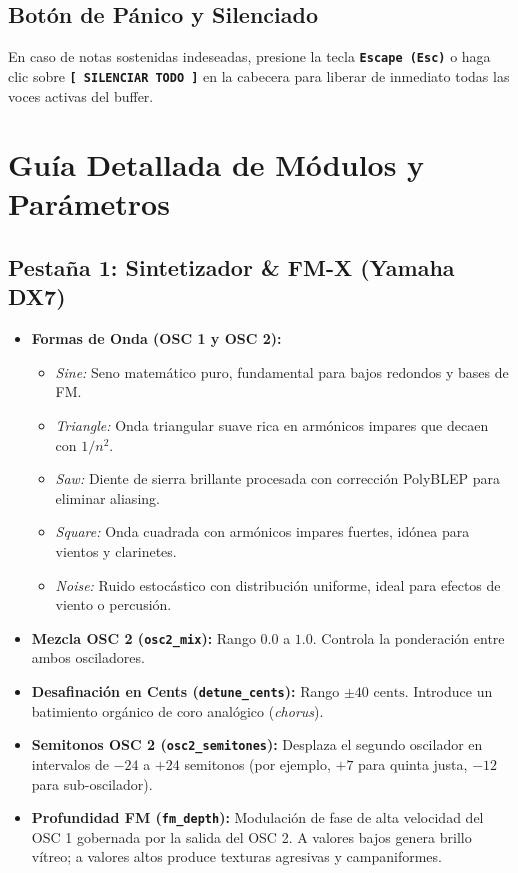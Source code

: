 \documentclass[11pt,a4paper]{article}
\begin{document}
\subsection{Botón de Pánico y Silenciado}
En caso de notas sostenidas indeseadas, presione la tecla \textbf{\texttt{Escape (Esc)}} o haga clic sobre \textbf{\texttt{[ SILENCIAR TODO ]}} en la cabecera para liberar de inmediato todas las voces activas del buffer.

\section{Guía Detallada de Módulos y Parámetros}

\subsection{Pestaña 1: Sintetizador \& FM-X (Yamaha DX7)}
\begin{itemize}[leftmargin=1.5cm]
    \item \textbf{Formas de Onda (OSC 1 y OSC 2):}
    \begin{itemize}
        \item \textit{Sine:} Seno matemático puro, fundamental para bajos redondos y bases de FM.
        \item \textit{Triangle:} Onda triangular suave rica en armónicos impares que decaen con $1/n^2$.
        \item \textit{Saw:} Diente de sierra brillante procesada con corrección PolyBLEP para eliminar aliasing.
        \item \textit{Square:} Onda cuadrada con armónicos impares fuertes, idónea para vientos y clarinetes.
        \item \textit{Noise:} Ruido estocástico con distribución uniforme, ideal para efectos de viento o percusión.
    \end{itemize}
    \item \textbf{Mezcla OSC 2 (\texttt{osc2\_mix}):} Rango $0.0$ a $1.0$. Controla la ponderación entre ambos osciladores.
    \item \textbf{Desafinación en Cents (\texttt{detune\_cents}):} Rango $\pm 40\text{ cents}$. Introduce un batimiento orgánico de coro analógico (\textit{chorus}).
    \item \textbf{Semitonos OSC 2 (\texttt{osc2\_semitones}):} Desplaza el segundo oscilador en intervalos de $-24$ a $+24$ semitonos (por ejemplo, $+7$ para quinta justa, $-12$ para sub-oscilador).
    \item \textbf{Profundidad FM (\texttt{fm\_depth}):} Modulación de fase de alta velocidad del OSC 1 gobernada por la salida del OSC 2. A valores bajos genera brillo vítreo; a valores altos produce texturas agresivas y campaniformes.
\end{itemize}
\end{document}

